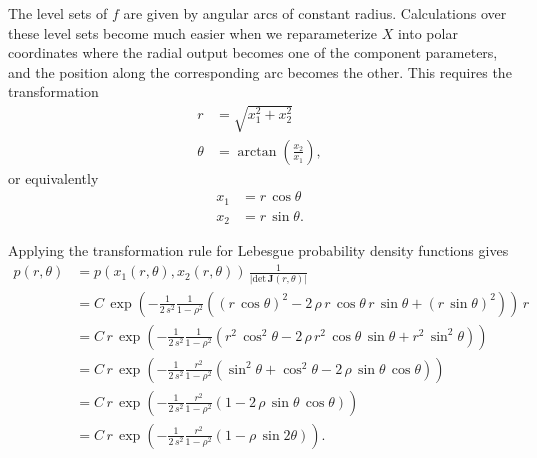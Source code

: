 \documentclass[
  letterpaper,
  DIV=11,
  numbers=noendperiod]{scrartcl}
\begin{document}
The level sets of \(f\) are given by angular arcs of constant radius.
Calculations over these level sets become much easier when we
reparameterize \(X\) into polar coordinates where the radial output
becomes one of the component parameters, and the position along the
corresponding arc becomes the other. This requires the transformation
\begin{align*}
r &= \sqrt{ x_{1}^{2} + x_{2}^{2} }
\\
\theta &= \arctan \left( \frac{ x_{2} }{ x_{1} } \right),
\end{align*} or equivalently \begin{align*}
x_{1} &= r \, \cos \theta
\\
x_{2} &= r \, \sin \theta.
\end{align*}

Applying the transformation rule for Lebesgue probability density
functions gives \begin{align*}
p(r, \theta)
&=
p( x_{1}(r, \theta), x_{2}(r, \theta) ) \,
\frac{1}{ | \mathrm{det} \, \mathbf{J}(r, \theta) | }
\\
&=
C \, \exp \left( - \frac{1}{2 \, s^{2}} \frac{1}{1 - \rho^{2}}
(   (r \, \cos \theta)^{2}
  - 2 \, \rho \, r \, \cos \theta \, r \, \sin \theta
  + (r \, \sin \theta)^{2} )
\right) \, r
\\
&=
C \, r \, \exp \left( - \frac{1}{2 \, s^{2}} \frac{1}{1 - \rho^{2}}
(   r^{2} \, \cos^{2} \theta
  - 2 \, \rho \, r^{2} \, \cos \theta \, \sin \theta
  + r^{2} \, \sin^{2} \theta )
\right)
\\
&=
C \, r \, \exp \left( - \frac{1}{2 \, s^{2}} \frac{r^{2}}{1 - \rho^{2}}
(   \sin^{2} \theta
  + \cos^{2} \theta
  - 2 \, \rho \, \sin \theta \, \cos \theta )
\right)
\\
&=
C \, r \, \exp \left( - \frac{1}{2 \, s^{2}} \frac{r^{2}}{1 - \rho^{2}}
( 1 - 2 \, \rho \, \sin \theta \, \cos \theta )
\right)
\\
&=
C \, r \, \exp \left( - \frac{1}{2 \, s^{2}} \frac{r^{2}}{1 - \rho^{2}}
( 1 - \rho \, \sin 2 \theta)
\right).
\end{align*}
\end{document}
